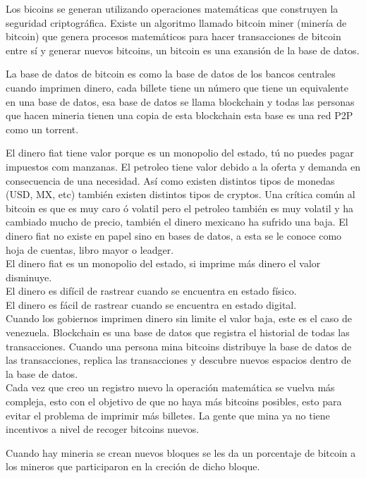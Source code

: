 \documentclass[a4paper,12pt]{/home/armando/Documentos/Cursos/LaTeX/Plantillas/lib/pub}
\begin{document}
Los bicoins se generan utilizando operaciones matemáticas que construyen la seguridad criptográfica. Existe un algoritmo llamado bitcoin miner (minería de bitcoin) que genera procesos matemáticos para hacer transacciones de bitcoin entre sí y generar nuevos bitcoins, un bitcoin es una exansión de la base de datos.

La base de datos de bitcoin es como la base de datos de los bancos centrales cuando imprimen dinero, cada billete tiene un número que tiene un equivalente en una base de datos, esa base de datos se llama blockchain y todas las personas que hacen mineria tienen una copia de esta blockchain esta base es una red P2P como un torrent.

El dinero fiat tiene valor porque es un monopolio del estado, tú no puedes pagar impuestos com manzanas.
El petroleo tiene valor debido a la oferta y demanda en consecuencia de una necesidad.
Así como existen distintos tipos de monedas (USD, MX, etc) también existen distintos tipos de cryptos.
Una crítica común al bitcoin es que es muy caro ó volatil pero el petroleo también es muy volatil y ha cambiado mucho de precio, también el dinero mexicano ha sufrido una baja.
El dinero fiat no existe en papel sino en bases de datos, a esta se le conoce como hoja de cuentas, libro mayor o leadger.\\
El dinero fiat es un monopolio del estado, si imprime más dinero el valor disminuye.\\
El dinero es difícil de rastrear cuando se encuentra en estado físico.\\
El dinero es fácil de rastrear cuando se encuentra en estado digital.\\

Cuando los gobiernos imprimen dinero sin limite el valor baja, este es el caso de venezuela.
Blockchain es una base de datos que registra el historial de todas las transacciones.
Cuando una persona mina bitcoins distribuye la base de datos de las transacciones, replica las transacciones y descubre nuevos espacios dentro de la base de datos.\\
Cada vez que creo un registro nuevo la operación matemática se vuelva más compleja, esto con el objetivo de que no haya más bitcoins posibles, esto para evitar el problema de imprimir más billetes. La gente que mina ya no tiene incentivos a nivel de recoger bitcoins nuevos.

Cuando hay mineria se crean nuevos bloques se les da un porcentaje de bitcoin a los mineros que participaron en la creción de dicho bloque.
\end{document}
